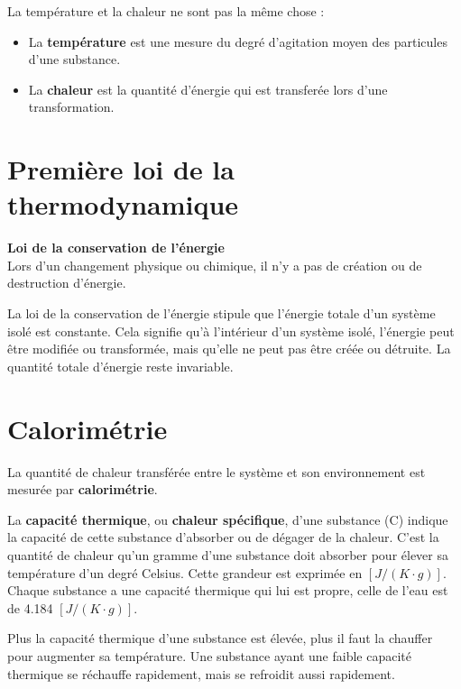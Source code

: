 \documentclass[
  11pt,
  french,
  a4paper,
  openany]{book}
\providecommand{\tightlist}{%
  \setlength{\itemsep}{0pt}\setlength{\parskip}{0pt}}
\begin{document}
La température et la chaleur ne sont pas la même chose :

\begin{itemize}
\tightlist
\item
  La \textbf{température} est une mesure du degré d'agitation moyen des particules d'une substance.
\item
  La \textbf{chaleur} est la quantité d'énergie qui est transferée lors d'une transformation.
\end{itemize}

\hypertarget{premiuxe8re-loi-de-la-thermodynamique}{%
\section{Première loi de la thermodynamique}\label{premiuxe8re-loi-de-la-thermodynamique}}

\begin{tcolorbox}
\textbf{Loi de la conservation de l'énergie}\\
Lors d'un changement physique ou chimique, il n'y a pas de création ou de destruction d'énergie.

\end{tcolorbox}

La loi de la conservation de l'énergie stipule que l'énergie totale d'un système isolé est constante. Cela signifie qu'à l'intérieur d'un système isolé, l'énergie peut être modifiée ou transformée, mais qu'elle ne peut pas être créée ou détruite. La quantité totale d'énergie reste invariable.

\hypertarget{calorimuxe9trie}{%
\section{Calorimétrie}\label{calorimuxe9trie}}

La quantité de chaleur transférée entre le système et son environnement est mesurée par \textbf{calorimétrie}.

La \textbf{capacité thermique}, ou \textbf{chaleur spécifique}, d'une substance (C) indique la capacité de cette substance d'absorber ou de dégager de la chaleur. C'est la quantité de chaleur qu'un gramme d'une substance doit absorber pour élever sa température d'un degré Celsius. Cette grandeur est exprimée en \([J/(K \cdot g)]\). Chaque substance a une capacité thermique qui lui est propre, celle de l'eau est de 4.184 \([J/(K \cdot g)]\).

Plus la capacité thermique d'une substance est élevée, plus il faut la chauffer pour augmenter sa température. Une substance ayant une faible capacité thermique se réchauffe rapidement, mais se refroidit aussi rapidement.
\end{document}
